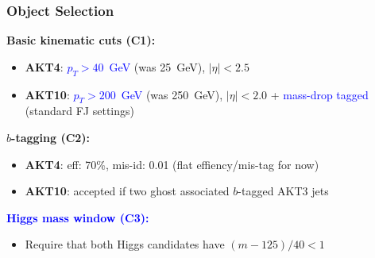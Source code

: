 \begin{frame}\frametitle{Object Selection}
\begin{footnotesize}
\textbf{Basic kinematic cuts (C1):}
\begin{itemize}
 \item \textbf{AKT4}: \textcolor{blue}{$p_T > 40$~GeV} (was 25~GeV), $|\eta| < 2.5$
 \item \textbf{AKT10}: \textcolor{blue}{$p_T > 200$~GeV} (was 250~GeV), $|\eta| < 2.0$ + \textcolor{blue}{mass-drop tagged} (standard FJ settings)
\end{itemize}
\vspace{0.5cm}
\textbf{$b$-tagging (C2):}
\begin{itemize}
 \item \textbf{AKT4}: eff: 70\%, mis-id: 0.01 (flat effiency/mis-tag for now)
 \item \textbf{AKT10}: accepted if two ghost associated $b$-tagged AKT3 jets
\end{itemize}
\vspace{0.5cm}
\textcolor{blue}{\textbf{Higgs mass window (C3):}}
\begin{itemize}
 \item Require that both Higgs candidates have $(m - 125)/40 < 1$
\end{itemize}
\end{footnotesize}
\end{frame}


